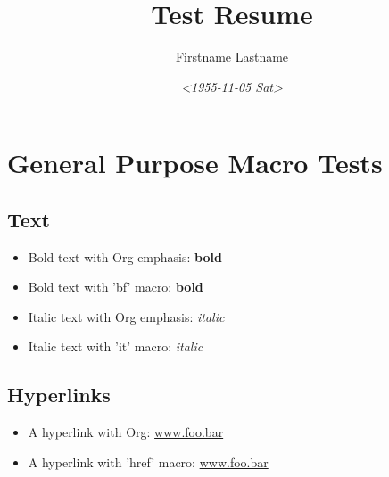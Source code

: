 \documentclass[11pt,letterpaper,sans]{moderncv}
\author{Firstname Lastname}
\date{\textit{<1955-11-05 Sat>}}
\title{Test Resume}
\begin{document}


\section{General Purpose Macro Tests}
\label{sec:orga78bee8}


\subsection{Text}
\label{sec:org8ca0884}

\begin{itemize}
\item Bold text with Org emphasis: \textbf{bold}
\item Bold text with 'bf' macro: \textbf{bold}
\item Italic text with Org emphasis: \emph{italic}
\item Italic text with 'it' macro: \emph{italic}
\end{itemize}


\subsection{Hyperlinks}
\label{sec:org8b6175a}
\begin{itemize}
\item A hyperlink with Org: \href{https://www.foo.bar}{www.foo.bar}
\item A hyperlink with 'href' macro: \href{https://www.foo.bar}{www.foo.bar}
\end{itemize}
\end{document}
